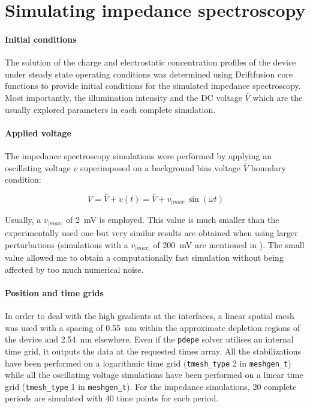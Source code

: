 \section{Simulating impedance spectroscopy}

\paragraph{Initial conditions}
The solution of the charge and electrostatic concentration profiles of the device under steady state operating conditions was determined using Driftfusion core functions to provide initial conditions for the simulated impedance spectroscopy.
Most importantly, the illumination intensity and the DC voltage $\bar V$ which are the usually explored parameters in each complete simulation.

\paragraph{Applied voltage}
The impedance spectroscopy simulations were performed by applying an oscillating voltage $v$ superimposed on a background bias voltage $\bar V$ boundary condition:

\begin{equation}
V = \bar V + v(t) = \bar V + v_|max| \sin(\omega t)
\end{equation}

Usually, a $v_|max|$ of \SI{2}{\mV} is employed.
This value is much smaller than the experimentally used one but very similar results are obtained when using larger perturbations (simulations with a $v_|max|$ of \SI{200}{\mV} are mentioned in ).
The small value allowed me to obtain a computationally fast simulation without being affected by too much numerical noise.

\paragraph{Position and time grids}
In order to deal with the high gradients at the interfaces, a linear spatial mesh was used with a spacing of \SI{0.55}{\nm} within the approximate depletion regions of the device and \SI{2.54}{\nm} elsewhere.
Even if the \texttt{pdepe} solver utilises an internal time grid, it outputs the data at the requested times array.
All the stabilizations have been performed on a logarithmic time grid (\texttt{tmesh\_type} 2 in \texttt{meshgen_t}) while all the oscillating voltage simulations have been performed on a linear time grid (\texttt{tmesh\_type} 1 in \texttt{meshgen_t}).
For the impedance simulations, 20 complete periods are simulated with 40 time points for each period.

